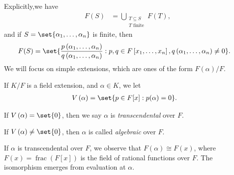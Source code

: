 \documentclass[10pt]{mypackage}
\begin{document}
Explicitly,we have
\begin{align*}
  F(S) &= \bigcup_{\substack{T\subseteq S\\T\text{ finite}}} F(T),
\end{align*}
and if $S = \set{\alpha_1,\dots,\alpha_n}$ is finite, then
\begin{align*}
  F(S) &= \set{ \frac{p\left( \alpha_1,\dots,\alpha_n \right)}{q\left( \alpha_1,\dots,\alpha_n \right)} : p,q\in F\left[ x_1,\dots,x_n \right],q\left( \alpha_1,\dots,\alpha_n \right)\neq 0 }.
\end{align*}
We will focus on simple extensions, which are ones of the form $F\left(\alpha\right)/F$.

If $K/F$ is a field extension, and $\alpha\in K$, we let
\begin{align*}
  V\left(\alpha\right) &= \set{p\in F[x] : p(\alpha) = 0}.
\end{align*}
\begin{definition}
 If $V\left(\alpha\right) = \set{0}$, then we say $\alpha$ is \textit{transcendental} over $F$.

 If $V\left( \alpha \right) \neq \set{0}$, then $\alpha$ is called \textit{algebraic} over $F$.
\end{definition}
If $\alpha$ is transcendental over $F$, we observe that $F(\alpha) \cong F(x)$, where $F(x) = \operatorname{frac}\left( F[x] \right)$ is the field of rational functions over $F$. The isomorphism emerges from evaluation at $\alpha$.
\end{document}
